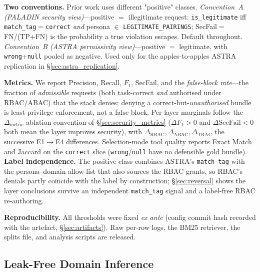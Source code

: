 \documentclass[sigconf,review,anonymous]{acmart}
\begin{document}
\textbf{Two conventions.} Prior work uses different "positive" classes. \emph{Convention~A (PALADIN security view)}---positive $=$ illegitimate request: \texttt{is\_legitimate} iff \texttt{match\_tag}$=$\texttt{correct} \emph{and} persona $\in$ \texttt{LEGITIMATE\_PAIRINGS}; SecFail$=$FN/(TP+FN) is the probability a true violation escapes. Default throughout. \emph{Convention~B (ASTRA permissivity view)}---positive $=$ legitimate, with \texttt{wrong}+\texttt{null} pooled as negative. Used only for the apples-to-apples ASTRA replication in \S\ref{sec:astra_replication}.

\textbf{Metrics.} We report Precision, Recall, $F_1$, SecFail, and the \emph{false-block rate}---the fraction of \emph{admissible} requests (both task-correct \emph{and} authorised under RBAC/ABAC) that the stack denies; denying a correct-but-\emph{unauthorised} bundle is least-privilege enforcement, not a false block. Per-layer marginals follow the $\Delta_{\text{metric}}$ ablation convention of \S\ref{sec:security_metrics} ($\Delta F_1\!>\!0$ and $\Delta\mathrm{SecFail}\!<\!0$ both mean the layer improves security), with $\Delta_{\mathrm{RBAC}},\Delta_{\mathrm{ABAC}},\Delta_{\mathrm{TRAC}}$ the successive E1$\to$E4 differences. Selection-mode tool quality reports Exact Match and Jaccard on the \texttt{correct} slice (\texttt{wrong}/\texttt{null} have no defensible gold bundle). \textbf{Label independence.} The positive class combines ASTRA's \texttt{match\_tag} with the persona--domain allow-list that also sources the RBAC grants, so RBAC's denials partly coincide with the label by construction; \S\ref{sec:reversal} shows the layer conclusions survive an independent \texttt{match\_tag} signal and a label-free RBAC re-authoring.

\textbf{Reproducibility.} All thresholds were fixed \emph{ex ante} (config commit hash recorded with the artefact, \S\ref{sec:artifacts}). Raw per-row logs, the BM25 retriever, the splits file, and analysis scripts are released.

\subsection{Leak-Free Domain Inference}
\label{sec:domain_inference}
\end{document}
